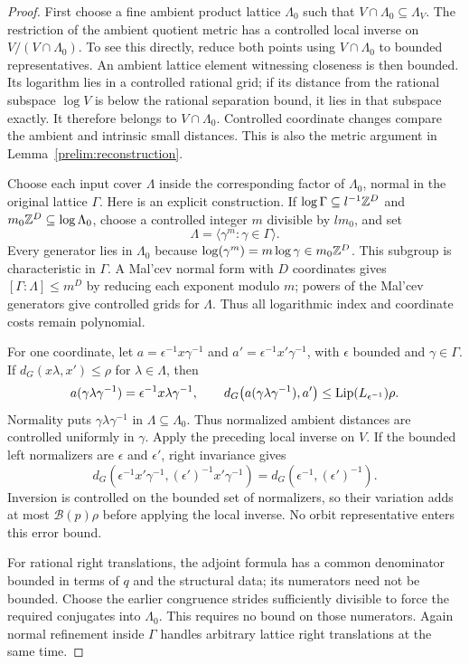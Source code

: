 \begin{proof}
First choose a fine ambient product lattice $\Lambda_0$ such that
$V\cap\Lambda_0\subseteq\Lambda_V$.
The restriction of the ambient quotient metric has a controlled
local inverse on $V/(V\cap\Lambda_0)$.
To see this directly, reduce both points using $V\cap\Lambda_0$
to bounded representatives.  An ambient lattice element witnessing
closeness is then bounded.  Its logarithm lies in a controlled
rational grid; if its distance from the rational subspace
$\log V$ is below the rational separation bound, it lies in that
subspace exactly.  It therefore belongs to $V\cap\Lambda_0$.
Controlled coordinate changes compare the ambient and intrinsic
small distances.  This is also the metric argument in
Lemma~\ref{prelim:reconstruction}.

Choose each input cover $\Lambda$ inside the corresponding factor
of $\Lambda_0$, normal in the original lattice $\Gamma$.
Here is an explicit construction.  If
$\log\Gamma\subseteq l^{-1}\mathbb Z^D$ and
$m_0\mathbb Z^D\subseteq\log\Lambda_0$, choose a controlled integer
$m$ divisible by $lm_0$, and set
\[
 \Lambda=\langle\gamma^m:\gamma\in\Gamma\rangle.
\]
Every generator lies in $\Lambda_0$ because
$\log(\gamma^m)=m\log\gamma\in m_0\mathbb Z^D$.
This subgroup is characteristic in $\Gamma$.
A Mal'cev normal form with $D$ coordinates gives
$[\Gamma:\Lambda]\leq m^D$ by reducing each exponent modulo
$m$; powers of the Mal'cev generators give controlled grids for
$\Lambda$.  Thus all logarithmic index and coordinate costs
remain polynomial.

For one coordinate, let
$a=\epsilon^{-1}x\gamma^{-1}$ and
$a'=\epsilon^{-1}x'\gamma^{-1}$, with $\epsilon$ bounded and
$\gamma\in\Gamma$.  If
$d_G(x\lambda,x')\leq\rho$ for $\lambda\in\Lambda$, then
\[
 a(\gamma\lambda\gamma^{-1})
   =\epsilon^{-1}x\lambda\gamma^{-1},\qquad
 d_G\bigl(a(\gamma\lambda\gamma^{-1}),a'\bigr)
   \leq\operatorname{Lip}(L_{\epsilon^{-1}})\rho.
\]
Normality puts $\gamma\lambda\gamma^{-1}$ in
$\Lambda\subseteq\Lambda_0$.  Thus normalized ambient distances
are controlled uniformly in $\gamma$.  Apply the preceding local
inverse on $V$.
If the bounded left normalizers are $\epsilon$ and $\epsilon'$,
right invariance gives
\[
 d_G(\epsilon^{-1}x'\gamma^{-1},
       (\epsilon')^{-1}x'\gamma^{-1})
 =d_G(\epsilon^{-1},(\epsilon')^{-1}).
\]
Inversion is controlled on the bounded set of normalizers, so their
variation adds at most $\mathcal B(p)\rho$ before applying the local
inverse.  No orbit representative enters this error bound.

For rational right translations, the adjoint formula has a common
denominator bounded in terms of $q$ and the structural data; its
numerators need not be bounded.  Choose the earlier congruence
strides sufficiently divisible to force the required conjugates
into $\Lambda_0$.  This requires no bound on those numerators.
Again normal refinement inside $\Gamma$ handles arbitrary lattice
right translations at the same time.
\end{proof}

